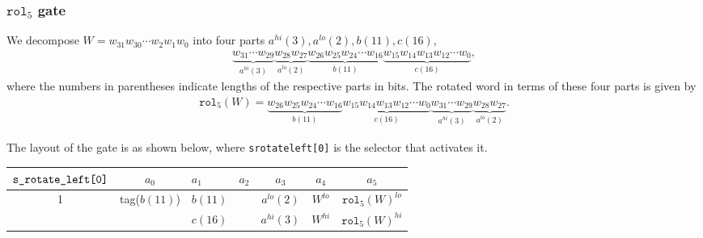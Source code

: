 \documentclass[10pt]{article}
\begin{document}
\subsubsection{$\texttt{rol}_5$ gate}%
\label{sec:rol_5_gate}
We decompose $W = w_{31}w_{30}\cdots w_2w_1w_0$ into four parts $a^{hi}(3), a^{lo}(2), b(11), c(16)$,
\begin{align*}
  \underbrace{w_{31}\cdots w_{29}}_{a^{hi}(3)} \underbrace{w_{28}w_{27}}_{a^{lo}(2)}
  \underbrace{w_{26}w_{25}w_{24}\cdots w_{16}}_{b(11)} \underbrace{w_{15}w_{14}w_{13}w_{12}\cdots w_{0}}_{c(16)},
\end{align*}
where the numbers in parentheses indicate lengths of the respective parts in bits. The rotated word in terms of these four parts is given by
\begin{align*}
  \texttt{rol}_5(W) = 
  \underbrace{w_{26}w_{25}w_{24}\cdots w_{16}}_{b(11)} \underbrace{w_{15}w_{14}w_{13}w_{12}\cdots w_{0}}_{c(16)}
\underbrace{w_{31}\cdots w_{29}}_{a^{hi}(3)} \underbrace{w_{28}w_{27}}_{a^{lo}(2)}.
\end{align*}

The layout of the gate is as shown below, where \texttt{s\textunderscore rotate\textunderscore left[0]} is the selector that activates it.

\begin{center}
  \begin{tabular}{c|c|l|l|c|c|c}
    $\texttt{s\textunderscore rotate\textunderscore left[0]}$ & $a_0$ & $a_1$ & $a_2$ & $a_3$ & $a_4$ & $a_5$ \\ \hline
    1  & tag($b(11)$) & $b(11)$ &                        & $a^{lo}(2)$ & $W^{lo}$  & $\texttt{rol}_5(W)^{lo}$  \\ 
       &              & $c(16)$ &                        & $a^{hi}(3)$ & $W^{hi}$  & $\texttt{rol}_5(W)^{hi}$  \\ \hline
  \end{tabular}
\end{center}
\end{document}

